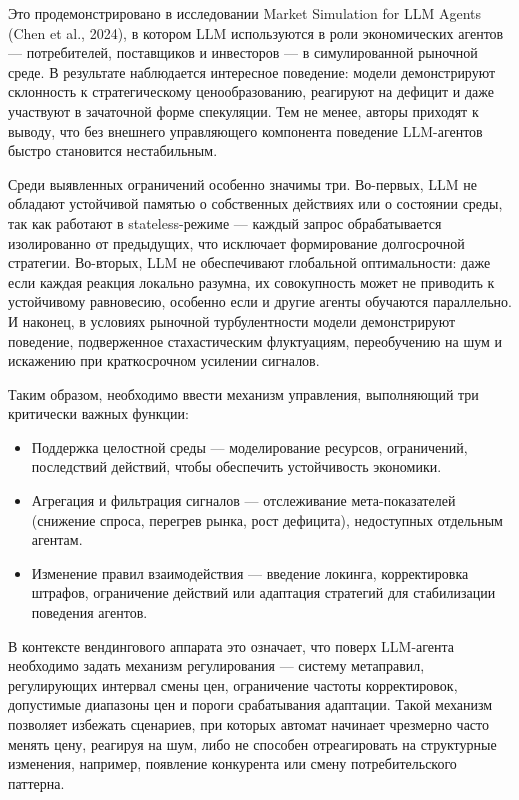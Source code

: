 \documentclass[
    14pt,
    specialist,
    candidate, %
    subf, %
    href,
    dotsinheaders=false
]{disser}
\begin{document}
Это продемонстрировано в исследовании Market Simulation for LLM Agents (Chen et al., 2024), в котором LLM используются в роли экономических агентов — потребителей, поставщиков и инвесторов — в симулированной рыночной среде. В результате наблюдается интересное поведение: модели демонстрируют склонность к стратегическому ценообразованию, реагируют на дефицит и даже участвуют в зачаточной форме спекуляции. Тем не менее, авторы приходят к выводу, что без внешнего управляющего компонента поведение LLM-агентов быстро становится нестабильным.

Среди выявленных ограничений особенно значимы три. Во-первых, LLM не обладают устойчивой памятью о собственных действиях или о состоянии среды, так как работают в stateless-режиме — каждый запрос обрабатывается изолированно от предыдущих, что исключает формирование долгосрочной стратегии. Во-вторых, LLM не обеспечивают глобальной оптимальности: даже если каждая реакция локально разумна, их совокупность может не приводить к устойчивому равновесию, особенно если и другие агенты обучаются параллельно. И наконец, в условиях рыночной турбулентности модели демонстрируют поведение, подверженное стахастическим флуктуациям, переобучению на шум и искажению при краткосрочном усилении сигналов.


Таким образом, необходимо ввести механизм управления, выполняющий три критически важных функции:

\begin{itemize}
  \item Поддержка целостной среды — моделирование ресурсов, ограничений, последствий действий, чтобы обеспечить устойчивость экономики.
  \item Агрегация и фильтрация сигналов — отслеживание мета-показателей (снижение спроса, перегрев рынка, рост дефицита), недоступных отдельным агентам.
  \item Изменение правил взаимодействия — введение локинга, корректировка штрафов, ограничение действий или адаптация стратегий для стабилизации поведения агентов.
\end{itemize}

В контексте вендингового аппарата это означает, что поверх LLM-агента необходимо задать механизм регулирования — систему метаправил, регулирующих интервал смены цен, ограничение частоты корректировок, допустимые диапазоны цен и пороги срабатывания адаптации. Такой механизм позволяет избежать сценариев, при которых автомат начинает чрезмерно часто менять цену, реагируя на шум, либо не способен отреагировать на структурные изменения, например, появление конкурента или смену потребительского паттерна.
\end{document}
